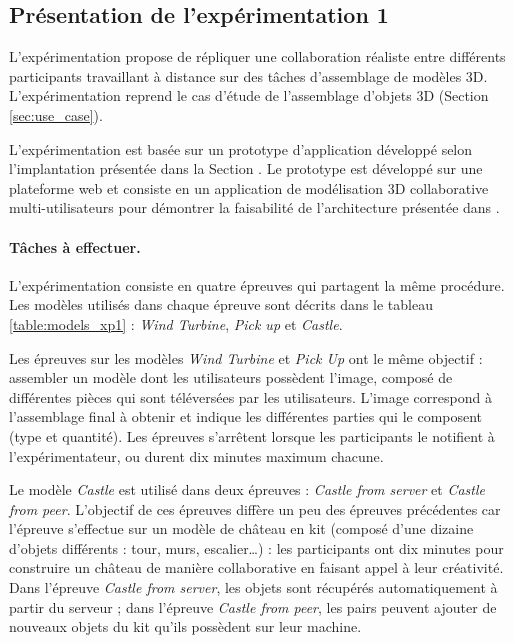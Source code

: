 
\subsection{Présentation de l'expérimentation 1}

L'expérimentation propose de répliquer une collaboration réaliste entre 
différents participants travaillant à distance sur des tâches d'assemblage de 
modèles \gls{3D}. L'expérimentation reprend le cas d'étude de l'assemblage d'objets 
\gls{3D} 
(Section \ref{sec:use_case}). 

L'expérimentation est basée sur un prototype d'application développé selon 
l'implantation présentée dans la Section .
Le prototype est développé sur une plateforme web et consiste en un application 
de modélisation \gls{3D} collaborative multi-utilisateurs pour démontrer la 
faisabilité de 
l'architecture présentée dans . 


\paragraph{Tâches à effectuer.}
L'expérimentation consiste en quatre épreuves qui partagent la même procédure.
Les modèles utilisés dans chaque épreuve sont décrits dans le tableau 
\ref{table:models_xp1} : \textit{Wind Turbine}, \textit{Pick up} et \textit{Castle}. 

Les épreuves sur les modèles \textit{Wind Turbine} et \textit{Pick Up} ont le 
même objectif : 
assembler un modèle dont les utilisateurs possèdent l'image, composé de 
différentes pièces qui sont téléversées par les utilisateurs. L'image correspond à 
l'assemblage final à obtenir et indique les différentes parties qui le 
composent (type et quantité). Les épreuves s'arrêtent lorsque les participants 
le notifient à l'expérimentateur, ou durent dix minutes maximum chacune.

Le modèle \textit{Castle} est utilisé dans deux épreuves : 
\textit{Castle from server} et \textit{Castle from peer}. L'objectif de ces épreuves
diffère un peu des épreuves précédentes car l'épreuve s'effectue sur un  modèle 
de château en kit (composé d'une dizaine d'objets différents : tour, murs, 
escalier\dots) : les 
participants ont dix minutes pour construire un 
château de manière collaborative en faisant appel à leur créativité. 
Dans l'épreuve \textit{Castle from server}, les objets sont récupérés 
automatiquement à partir du serveur ; 
dans l'épreuve \textit{Castle from peer}, les pairs peuvent ajouter de nouveaux 
objets du kit qu'ils possèdent sur leur machine.

